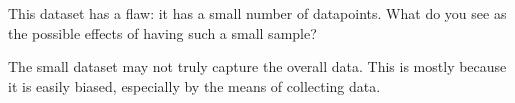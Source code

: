 This dataset has a flaw: it has a small number of datapoints. What do you see as the possible effects of having such a small sample?

\begin{solution}
    The small dataset may not truly capture the overall data. This is mostly because it is easily biased, especially by the means of collecting data.
\end{solution}